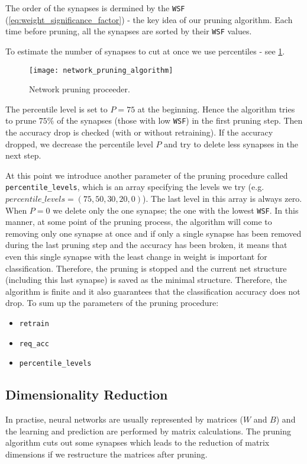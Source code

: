 The order of the synapses is dermined by the \texttt{WSF} (\cref{eq:weight_significance_factor}) - the key idea of our pruning algorithm. Each time before pruning, all the synapses are sorted by their \texttt{WSF} values.

To estimate the number of synapses to cut at once we use percentiles - see \cref{fig:methods:network_pruning_proceeder}.

\begin{figure}[H]
  \centering
  \texttt{[image: network\_pruning\_algorithm]}
  \caption{Network pruning proceeder.}
  \label{fig:methods:network_pruning_proceeder}
\end{figure}

The percentile level is set to $ P = 75 $ at the beginning. Hence the algorithm tries to prune $ 75\% $ of the synapses (those with low \texttt{WSF}) in the first pruning step. Then the accuracy drop is checked (with or without retraining). If the accuracy dropped, we decrease the percentile level $ P $ and try to delete less synapses in the next step.

At this point we introduce another parameter of the pruning procedure called \texttt{percentile\_levels}, which is an array specifying the levels we try (e.g.  $percentile\_levels = (75, 50, 30, 20, 0) $). The last level in this array is always zero. When $ P = 0 $ we delete only the one synapse; the one with the lowest \texttt{WSF}. In this manner, at some point of the pruning process, the algorithm will come to removing only one synapse at once and if only a single synapse has been removed during the last pruning step and the accuracy has been broken, it means that even this single synapse with the least change in weight is important for classification. Therefore, the pruning is stopped and the current net structure (including this last synapse) is saved as the minimal structure. Therefore, the algorithm is finite and it also guarantees that the classification accuracy does not drop. To sum up the parameters of the pruning procedure:

\begin{itemize}
\item \texttt{retrain}
\item \texttt{req\_acc}
\item \texttt{percentile\_levels}
\end{itemize}

\subsection*{Dimensionality Reduction}
In practise, neural networks are usually represented by matrices ($ W $ and $ B $) and the learning and prediction are performed by matrix calculations. The pruning algorithm cuts out some synapses which leads to the reduction of matrix dimensions if we restructure the matrices after pruning.


